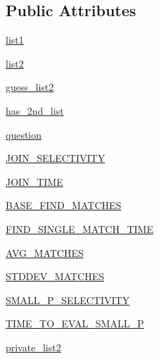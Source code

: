 \subsection*{Public Attributes}
\begin{DoxyCompactItemize}
\item 
\hyperlink{classdynamicfilterapp_1_1models_1_1_join_a6a3026f5b982e8d120fcdf1263775a9f}{list1}
\item 
\hyperlink{classdynamicfilterapp_1_1models_1_1_join_a50a79ea070b020da6dab2bce1e31da3f}{list2}
\item 
\hyperlink{classdynamicfilterapp_1_1models_1_1_join_ad05a435e0123cee2d630f3a6f253deba}{guess\+\_\+list2}
\item 
\hyperlink{classdynamicfilterapp_1_1models_1_1_join_abee8b19cb56f38f5834e09e82ec9757b}{has\+\_\+2nd\+\_\+list}
\item 
\hyperlink{classdynamicfilterapp_1_1models_1_1_join_a1a1b6bd27a93f9139a2f44d01f7b3ad1}{question}
\item 
\hyperlink{classdynamicfilterapp_1_1models_1_1_join_a4eec4870d690cac806ee9a954e8d793c}{J\+O\+I\+N\+\_\+\+S\+E\+L\+E\+C\+T\+I\+V\+I\+TY}
\item 
\hyperlink{classdynamicfilterapp_1_1models_1_1_join_a2c37c419033162e3fc2632987e65647e}{J\+O\+I\+N\+\_\+\+T\+I\+ME}
\item 
\hyperlink{classdynamicfilterapp_1_1models_1_1_join_a149aa51e1bac1266ca1f8e2eed2ca2ab}{B\+A\+S\+E\+\_\+\+F\+I\+N\+D\+\_\+\+M\+A\+T\+C\+H\+ES}
\item 
\hyperlink{classdynamicfilterapp_1_1models_1_1_join_a82c364d7ac06cd8c42ccf394d0c610ef}{F\+I\+N\+D\+\_\+\+S\+I\+N\+G\+L\+E\+\_\+\+M\+A\+T\+C\+H\+\_\+\+T\+I\+ME}
\item 
\hyperlink{classdynamicfilterapp_1_1models_1_1_join_a42fd69e46cbed84fb4eb077014ab26c0}{A\+V\+G\+\_\+\+M\+A\+T\+C\+H\+ES}
\item 
\hyperlink{classdynamicfilterapp_1_1models_1_1_join_a52e0d809d7c34941ca658179c684cc1d}{S\+T\+D\+D\+E\+V\+\_\+\+M\+A\+T\+C\+H\+ES}
\item 
\hyperlink{classdynamicfilterapp_1_1models_1_1_join_a17c32d7a1280b5817ac92be68a5f30cd}{S\+M\+A\+L\+L\+\_\+\+P\+\_\+\+S\+E\+L\+E\+C\+T\+I\+V\+I\+TY}
\item 
\hyperlink{classdynamicfilterapp_1_1models_1_1_join_aa18e8aadd97714397358bc349089d8db}{T\+I\+M\+E\+\_\+\+T\+O\+\_\+\+E\+V\+A\+L\+\_\+\+S\+M\+A\+L\+L\+\_\+P}
\item 
\hyperlink{classdynamicfilterapp_1_1models_1_1_join_aacba7fad0393ddea9ffe3688e2a984b1}{private\+\_\+list2}

\end{DoxyCompactItemize}
